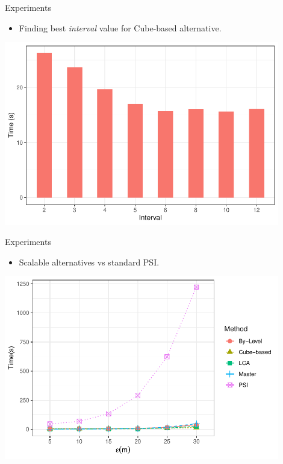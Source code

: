 \begin{frame}{Experiments}
    \begin{itemize}
        \item Finding best \textit{interval} value for Cube-based alternative.
    \end{itemize} \vspace{0.25cm}

    \centering
    \includegraphics[width=0.9\textwidth]
            {../thesis/chapterPFlocks/figures/plots/07_interval_performance/interval-performance}
\end{frame}

\begin{frame}{Experiments}
    \begin{itemize}
        \item Scalable alternatives vs standard PSI.
    \end{itemize} \vspace{0.25cm}

    \centering
    \includegraphics[width=0.9\textwidth]
            {../thesis/chapterPFlocks/figures/plots/08_sequential_parallel/la25k_e_bfe_psi}
\end{frame}

